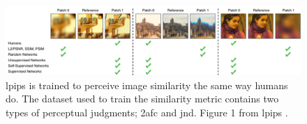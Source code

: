 \begin{figure}[ht]
    \centering
    \includegraphics[width=1.0\textwidth]{figures/lpips.png}
        \caption[LPIPS - Learned Perceptual Image Patch Similarity]{\acrshort{lpips} is trained to perceive image similarity the same way humans do. The dataset used to train the similarity metric contains two types of perceptual judgments; \acrshort{2afc} and \acrshort{jnd}. Figure 1 from \acrshort{lpips} \cite{zhang_unreasonable_2018}.}
    \label{fig:lpips}
\end{figure}

